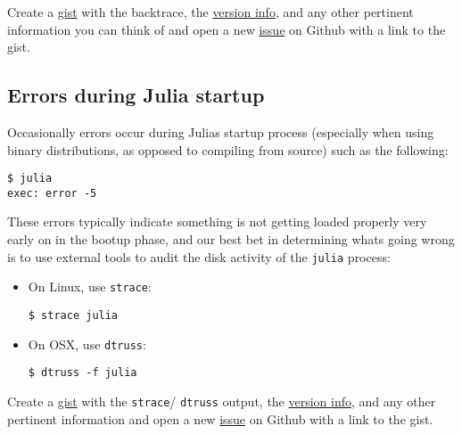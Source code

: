 Create a \href{https://gist.github.com}{gist} with the backtrace, the \hyperlink{4601189142062189569}{version info}, and any other pertinent information you can think of and open a new \href{https://github.com/JuliaLang/julia/issues?q=is\%3Aopen}{issue} on Github with a link to the gist.



\hypertarget{8599391806074935874}{}


\subsection{Errors during Julia startup}



Occasionally errors occur during Julia{\textquotesingle}s startup process (especially when using binary distributions, as opposed to compiling from source) such as the following:




\begin{verbatim}
$ julia
exec: error -5
\end{verbatim}



These errors typically indicate something is not getting loaded properly very early on in the bootup phase, and our best bet in determining what{\textquotesingle}s going wrong is to use external tools to audit the disk activity of the \texttt{julia} process:



\begin{itemize}
\item On Linux, use \texttt{strace}:


\begin{lstlisting}
$ strace julia
\end{lstlisting}


\item On OSX, use \texttt{dtruss}:


\begin{lstlisting}
$ dtruss -f julia
\end{lstlisting}

\end{itemize}


Create a \href{https://gist.github.com}{gist} with the \texttt{strace}/ \texttt{dtruss} output, the \hyperlink{4601189142062189569}{version info}, and any other pertinent information and open a new \href{https://github.com/JuliaLang/julia/issues?q=is\%3Aopen}{issue} on Github with a link to the gist.



